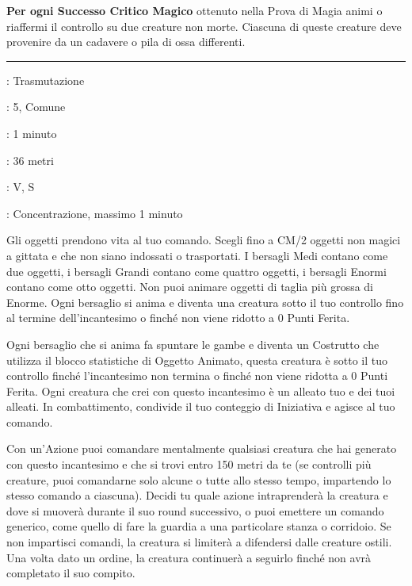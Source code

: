 \begin{multicols}{2}
\textbf{Per ogni Successo Critico Magico} ottenuto nella Prova di Magia animi o riaffermi il controllo su due creature non morte. Ciascuna di queste creature deve provenire da un cadavere o pila di ossa differenti.

\smallskip\noindent\rule{\linewidth}{2pt} \hypertarget{Animare Oggetti}{}\medskip{}\label{Animate Object}
\noindent
\begin{description}[noitemsep, topsep=0pt, parsep=0pt, partopsep=0pt, leftmargin=0cm, labelwidth=2.8cm]
\item[\textbf{Lista di Magia}]: Trasmutazione
\item[\textbf{Livello}]: 5, Comune
\item[\textbf{T. di Lancio}]: 1 minuto
\item[\textbf{Gittata}]: 36 metri
\item[\textbf{Componenti}]: V, S
\item[\textbf{Durata}]: Concentrazione, massimo 1 minuto
\end{description}

Gli oggetti prendono vita al tuo comando. Scegli fino a CM/2 oggetti non magici a gittata e che non siano indossati o trasportati. I bersagli Medi contano come due oggetti, i bersagli Grandi contano come quattro oggetti, i bersagli Enormi contano come otto oggetti. Non puoi animare oggetti di taglia più grossa di Enorme. Ogni bersaglio si anima e diventa una creatura sotto il tuo controllo fino al termine dell'incantesimo o finché non viene ridotto a 0 Punti Ferita.

Ogni bersaglio che si anima fa spuntare le gambe e diventa un Costrutto che utilizza il blocco statistiche di Oggetto Animato, questa creatura è sotto il tuo controllo finché l'incantesimo non termina o finché non viene ridotta a 0 Punti Ferita. Ogni creatura che crei con questo incantesimo è un alleato tuo e dei tuoi alleati. In combattimento, condivide il tuo conteggio di Iniziativa e agisce al tuo comando.

Con un'Azione puoi comandare mentalmente qualsiasi creatura che hai generato con questo incantesimo e che si trovi entro 150 metri da te (se controlli più creature, puoi comandarne solo alcune o tutte allo stesso tempo, impartendo lo stesso comando a ciascuna).
Decidi tu quale azione intraprenderà la creatura e dove si muoverà durante il suo round successivo, o puoi emettere un comando generico, come quello di fare la guardia a una particolare stanza o corridoio.
Se non impartisci comandi, la creatura si limiterà a difendersi dalle creature ostili. Una volta dato un ordine, la creatura continuerà a seguirlo finché non avrà completato il suo compito.


\end{multicols}
